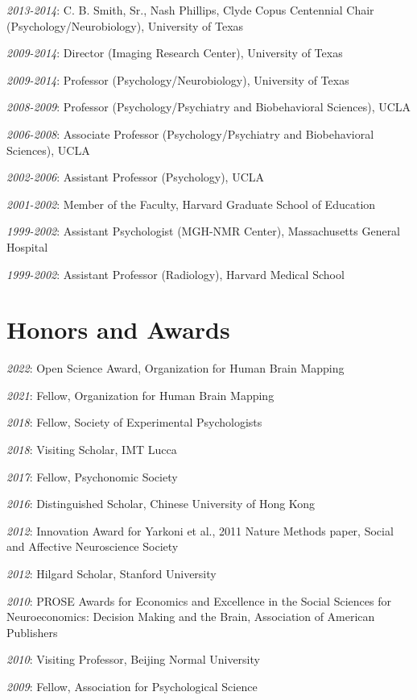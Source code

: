 \documentclass[10pt, letterpaper]{article}
\begin{document}
\textit{2013-2014}: C. B. Smith, Sr., Nash Phillips, Clyde Copus Centennial Chair (Psychology/Neurobiology), University of Texas

\textit{2009-2014}: Director (Imaging Research Center), University of Texas

\textit{2009-2014}: Professor (Psychology/Neurobiology), University of Texas

\textit{2008-2009}: Professor (Psychology/Psychiatry and Biobehavioral Sciences), UCLA

\textit{2006-2008}: Associate Professor (Psychology/Psychiatry and Biobehavioral Sciences), UCLA

\textit{2002-2006}: Assistant Professor (Psychology), UCLA

\textit{2001-2002}: Member of the Faculty, Harvard Graduate School of Education

\textit{1999-2002}: Assistant Psychologist (MGH-NMR Center), Massachusetts General Hospital

\textit{1999-2002}: Assistant Professor (Radiology), Harvard Medical School

\section*{Honors and Awards}
\noindent

\textit{2022}: Open Science Award, Organization for Human Brain Mapping

\textit{2021}: Fellow, Organization for Human Brain Mapping

\textit{2018}: Fellow, Society of Experimental Psychologists

\textit{2018}: Visiting Scholar, IMT Lucca

\textit{2017}: Fellow, Psychonomic Society

\textit{2016}: Distinguished Scholar, Chinese University of Hong Kong

\textit{2012}: Innovation Award for Yarkoni et al., 2011 Nature Methods paper, Social and Affective Neuroscience Society

\textit{2012}: Hilgard Scholar, Stanford University

\textit{2010}: PROSE Awards for Economics and Excellence in the Social Sciences for Neuroeconomics: Decision Making and the Brain, Association of American Publishers

\textit{2010}: Visiting Professor, Beijing Normal University

\textit{2009}: Fellow, Association for Psychological Science
\end{document}

